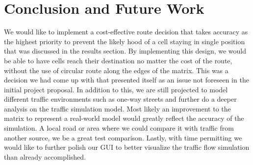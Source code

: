 \documentclass[sigplan,screen]{acmart}
\begin{document}
\section{Conclusion and Future Work}
We would like to implement a cost-effective route decision that takes accuracy
as the highest priority to prevent the likely hood of a cell staying in single
position that was discussed in the results section. By implementing this design,
we would be able to have cells reach their destination no matter the cost of the
route, without the use of circular route along the edges of the matrix. This was
a decision we had come up with that presented itself as an issue not foreseen in
the initial project proposal. In addition to this, we are still projected to
model different traffic environments such as one-way streets and further do a
deeper analysis on the traffic simulation model. Most likely an improvement to
the matrix to represent a real-world model would greatly reflect the accuracy of
the simulation. A local road or area where we could compare it with traffic from
another source, we be a great test comparison. Lastly, with time permitting we
would like to further polish our GUI to better visualize the traffic flow
simulation than already accomplished.  



\end{document}
